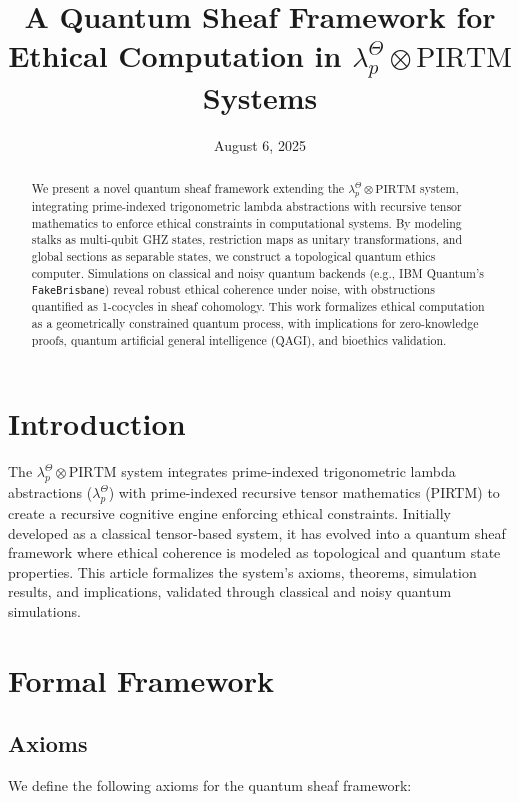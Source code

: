 \documentclass{article}
\begin{document}
\title{A Quantum Sheaf Framework for Ethical Computation in $\lambda_p^\Theta \otimes \text{PIRTM}$ Systems}
\author{}
\date{August 6, 2025}
\maketitle

\begin{abstract}
We present a novel quantum sheaf framework extending the $\lambda_p^\Theta \otimes \text{PIRTM}$ system, integrating prime-indexed trigonometric lambda abstractions with recursive tensor mathematics to enforce ethical constraints in computational systems. By modeling stalks as multi-qubit GHZ states, restriction maps as unitary transformations, and global sections as separable states, we construct a topological quantum ethics computer. Simulations on classical and noisy quantum backends (e.g., IBM Quantum's \texttt{FakeBrisbane}) reveal robust ethical coherence under noise, with obstructions quantified as 1-cocycles in sheaf cohomology. This work formalizes ethical computation as a geometrically constrained quantum process, with implications for zero-knowledge proofs, quantum artificial general intelligence (QAGI), and bioethics validation.
\end{abstract}

\section{Introduction}
The $\lambda_p^\Theta \otimes \text{PIRTM}$ system integrates prime-indexed trigonometric lambda abstractions ($\lambda_p^\Theta$) with prime-indexed recursive tensor mathematics (PIRTM) to create a recursive cognitive engine enforcing ethical constraints. Initially developed as a classical tensor-based system, it has evolved into a quantum sheaf framework where ethical coherence is modeled as topological and quantum state properties. This article formalizes the system’s axioms, theorems, simulation results, and implications, validated through classical and noisy quantum simulations.

\section{Formal Framework}

\subsection{Axioms}
We define the following axioms for the quantum sheaf framework:
\end{document}
